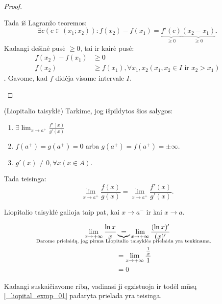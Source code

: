 \begin{prop}
\begin{proof}
\begin{description}
        Tada iš Lagranžo teoremos:
        \begin{equation*}
          \exists c (c \in (x_{1};x_{2})) : 
            f(x_{2}) - f(x_{1}) = 
            \underbrace{f'(c)}_{\geq 0}
            \underbrace{(x_{2} - x_{1})}_{\geq 0}.
        \end{equation*}
        Kadangi dešinė pusė $\geq 0$, tai ir kairė pusė:
        \begin{align*}
          f(x_{2}) - f(x_{1}) &\geq 0 \\
          f(x_{2}) &\geq f(x_{1}), \forall x_{1}, x_{2} 
            (x_{1}, x_{2} \in I \text{ ir } x_{2} > x_{1})
        \end{align*}.
        Gavome, kad $f$ didėja visame intervale $I$.

    \end{description}
  \end{proof}
\end{prop}

\begin{prop}
  (Liopitalio taisyklė) Tarkime, jog išpildytos šios salygos:
  \begin{enumerate}
    \item $\exists \lim_{x \to a^{+}} \frac{f'(x)}{g'(x)}$
    \item $f(a^{+}) = g(a^{+}) = 0$ arba 
      $g(a^{+}) = f(a^{+}) = \pm \infty$.
    \item $g'(x) \neq 0, \forall x (x \in A)$.
  \end{enumerate}

  Tada teisinga:
  \begin{equation*}
    \lim_{x \to a^{+}} \frac{f(x)}{g(x)} = 
    \lim_{x \to a^{+}} \frac{f'(x)}{g'(x)}.
  \end{equation*}
\end{prop}

\begin{note}
  Liopitalio taisyklė galioja taip pat, kai $x \to a^{-}$ ir kai 
  $x \to a$.
\end{note}

\begin{exmp}
  \begin{align}
    \lim_{x \to +\infty} \frac{\ln x}{x}
    &\underbrace{=}_{\mathclap{
      \text{Darome prielaidą, jog pirma Liopitalio taisyklės 
      prielaida yra tenkinama.}}}
    \lim_{x \to +\infty} \frac{(\ln x)'}{(x)'}
    \label{_liopital_exmp_01} \\
    &= \lim_{x \to +\infty} \frac{\frac{1}{x}}{1} \\
    &= 0
    \label{_liopital_exmp_02}
  \end{align}

  Kadangi suskaičiavome ribą, vadinasi ji egzistuoja ir todėl mūsų
  \ref{_liopital_exmp_01} padaryta prielada yra teisinga.
\end{exmp}

